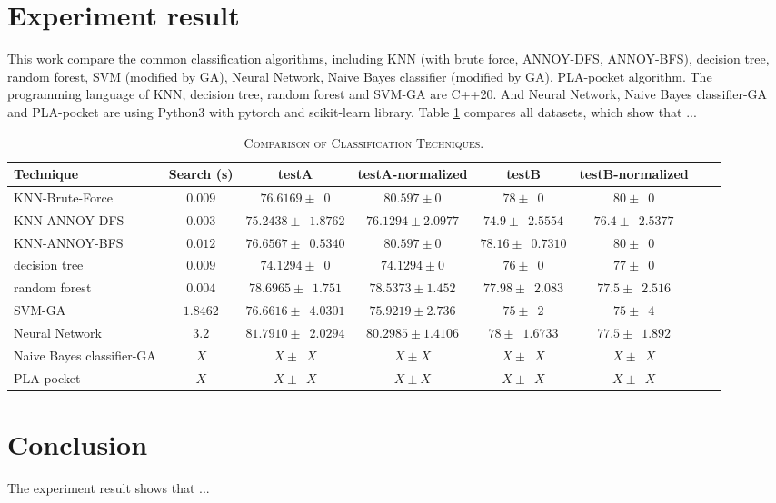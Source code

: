 \documentclass[twocolumn,10pt]{article}
\begin{document}
\section{Experiment result}
  This work compare the common classification algorithms, including KNN (with brute force, ANNOY-DFS, ANNOY-BFS), decision tree, 
  random forest, SVM (modified by GA), Neural Network, Naive Bayes classifier (modified by GA), PLA-pocket algorithm. 
  The programming language of KNN, decision tree, random forest and SVM-GA are C++20. And Neural Network, Naive Bayes classifier-GA 
  and PLA-pocket are using Python3 with pytorch and scikit-learn library. 
  Table \ref{table:overall} compares all datasets, which show that ...
  \begin{table}[htb]
    \newcommand{\z}{\phantom{0}}
    \caption{\textsc{Comparison of Classification Techniques.}}
      \vspace{-\baselineskip}
    \begin{tabular}{@{}lccccccl@{}}\toprule
    Technique & Search (s) & testA & testA-normalized & testB & testB-normalized \\ \midrule
    KNN-Brute-Force  & $0.009$ & $76.6169 \pm \z{0}$                & $80.597 \pm 0$               & $78 \pm \z{0}$                 & $80 \pm \z{0}$\\
    KNN-ANNOY-DFS    & $0.003$ & $75.2438 \pm \z{1.8762}$           & $76.1294 \pm 2.0977$         & $74.9 \pm \z{2.5554}$          & $76.4 \pm \z{2.5377}$\\
    KNN-ANNOY-BFS    & $0.012$ & $76.6567 \pm \z{0.5340}$           & $80.597 \pm 0$               & $78.16 \pm \z{0.7310}$         & $80 \pm \z{0}$\\
    decision tree    & $0.009$ & $74.1294 \pm \z{0}$                & $74.1294 \pm 0$              & $76 \pm \z{0}$                 & $77 \pm \z{0}$\\
    random forest    & $0.004$ & $78.6965 \pm \z{1.751}$            & $78.5373 \pm 1.452$          & $77.98 \pm \z{2.083}$          & $77.5 \pm \z{2.516}$\\
    SVM-GA           & $1.8462$ & $76.6616 \pm \z{4.0301}$          & $75.9219 \pm 2.736$          & $75 \pm \z{2}$                  & $75 \pm \z{4}$\\
    Neural Network   & $3.2$   & $81.7910 \pm \z{2.0294}$           & $80.2985 \pm 1.4106$         & $78 \pm \z{1.6733}$            & $77.5 \pm \z{1.892}$\\
    Naive Bayes classifier-GA    & $X$ & $X \pm \z{X}$              & $X \pm X$                    & $X \pm \z{X}$                  & $X \pm \z{X}$\\
    PLA-pocket       & $X$ & $X \pm \z{X}$                          & $X \pm X$                    & $X \pm \z{X}$                  & $X \pm \z{X}$\\ \midrule
    \end{tabular}
    \label{table:overall}
      \vspace{-\baselineskip}
  \end{table}

\section{Conclusion}
  The experiment result shows that ...


\end{document}

